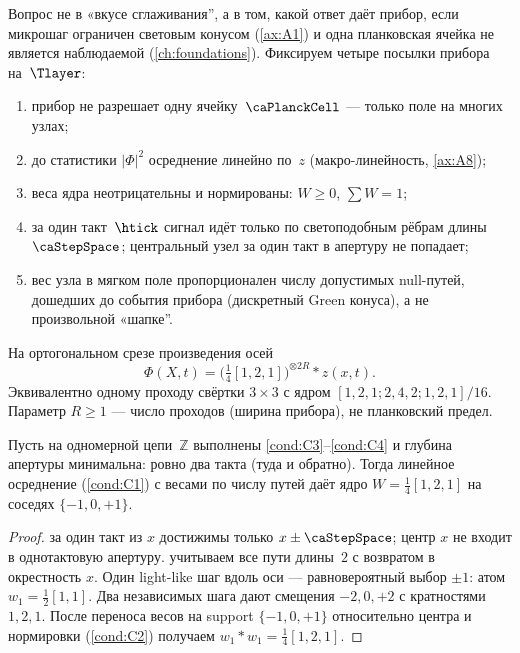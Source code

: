 Вопрос не в «вкусе сглаживания'', а в том, какой ответ даёт прибор,
если микрошаг ограничен световым конусом (\cref{ax:A1}) и одна планковская ячейка
не является наблюдаемой (\cref{ch:foundations}).
Фиксируем четыре посылки прибора на~$\Tlayer$:
\begin{enumerate}[label=\textbf{C\arabic*:},leftmargin=*]
\item \label{cond:C0}
  прибор не разрешает одну ячейку~$\PlanckCell$ --- только поле на многих узлах;
\item \label{cond:C1}
  до статистики $|\Phi|^2$ осреднение линейно по~$z$ (макро-линейность, \cref{ax:A8});
\item \label{cond:C2}
  веса ядра неотрицательны и нормированы: $W\ge 0$, $\sum W=1$;
\item \label{cond:C3}
  за один такт~$\htick$ сигнал идёт только по светоподобным рёбрам длины~$\caStepSpace$;
  центральный узел за один такт в апертуру не попадает;
\item \label{cond:C4}
  вес узла в мягком поле пропорционален числу допустимых null-путей,
  дошедших до события прибора (дискретный Green конуса), а не произвольной «шапке''.
\end{enumerate}

\begin{definition}
\label{def:soft-readout}
На ортогональном срезе произведения осей
\[
  \Phi(X,t)=\bigl(\tfrac14[1,2,1]\bigr)^{\otimes 2R} * z(x,t).
\]
Эквивалентно одному проходу свёртки $3\times 3$ с ядром $[1,2,1;2,4,2;1,2,1]/16$.
Параметр $R\ge 1$ --- число проходов (ширина прибора), не планковский предел.
\end{definition}

\begin{proposition}
\label{prop:kernel-121}
Пусть на одномерной цепи~$\mathbb{Z}$ выполнены \ref{cond:C3}--\ref{cond:C4}
и глубина апертуры минимальна: ровно два такта (туда и обратно).
Тогда линейное осреднение (\ref{cond:C1}) с весами по числу путей даёт ядро
$W=\tfrac14[1,2,1]$ на соседях $\{-1,0,+1\}$.
\end{proposition}

\begin{proof}
\pusing{\ref{cond:C3}}
за один такт из $x$ достижимы только $x\pm\caStepSpace$; центр $x$ не входит в однотактовую апертуру.
учитываем все пути длины~$2$ с возвратом в окрестность $x$.
Один light-like шаг вдоль оси --- равновероятный выбор $\pm 1$:
атом $w_1=\tfrac12[1,1]$.
Два независимых шага дают смещения $-2,0,+2$ с кратностями $1,2,1$.
После переноса весов на support $\{-1,0,+1\}$ относительно центра и нормировки (\ref{cond:C2})
получаем $w_1*w_1=\tfrac14[1,2,1]$.
\end{proof}

